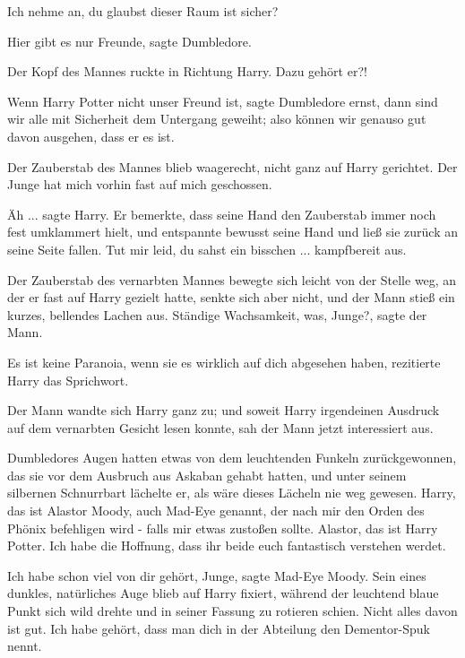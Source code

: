 \glqq{}Ich nehme an, du glaubst dieser Raum ist sicher?\grqq{}

\glqq{}Hier gibt es nur Freunde\grqq{}, sagte Dumbledore.

Der Kopf des Mannes ruckte in Richtung Harry. \glqq{}Dazu gehört er?!\grqq{}

\glqq{}Wenn Harry Potter nicht unser Freund ist\grqq{}, sagte Dumbledore ernst,
\glqq{}dann sind wir alle mit Sicherheit dem Untergang geweiht; also können wir
genauso gut davon ausgehen, dass er es ist.\grqq{}

Der Zauberstab des Mannes blieb waagerecht, nicht ganz auf Harry gerichtet.
\glqq{}Der Junge hat mich vorhin fast auf mich geschossen.\grqq{}

\glqq{}Äh ...\grqq{} sagte Harry. Er bemerkte, dass seine Hand den Zauberstab
immer noch fest umklammert hielt, und entspannte bewusst seine Hand und ließ sie
zurück an seine Seite fallen. \glqq{}Tut mir leid, du sahst ein bisschen ...
kampfbereit aus.\grqq{}

Der Zauberstab des vernarbten Mannes bewegte sich leicht von der Stelle weg, an
der er fast auf Harry gezielt hatte, senkte sich aber nicht, und der Mann stieß
ein kurzes, bellendes Lachen aus. \glqq{}Ständige Wachsamkeit, was,
Junge?\grqq{}, sagte der Mann.

\glqq{}Es ist keine Paranoia, wenn sie es wirklich auf dich abgesehen
haben\grqq{}, rezitierte Harry das Sprichwort.

Der Mann wandte sich Harry ganz zu; und soweit Harry irgendeinen Ausdruck auf
dem vernarbten Gesicht lesen konnte, sah der Mann jetzt interessiert aus.

Dumbledores Augen hatten etwas von dem leuchtenden Funkeln zurückgewonnen, das
sie vor dem Ausbruch aus Askaban gehabt hatten, und unter seinem silbernen
Schnurrbart lächelte er, als wäre dieses Lächeln nie weg gewesen. \glqq{}Harry,
das ist Alastor Moody, auch Mad-Eye genannt, der nach mir den Orden des Phönix
befehligen wird - falls mir etwas zustoßen sollte. Alastor, das ist Harry
Potter. Ich habe die Hoffnung, dass ihr beide euch fantastisch verstehen
werdet.\grqq{}

\glqq{}Ich habe schon viel von dir gehört, Junge\grqq{}, sagte Mad-Eye Moody.
Sein eines dunkles, natürliches Auge blieb auf Harry fixiert, während der
leuchtend blaue Punkt sich wild drehte und in seiner Fassung zu rotieren schien.
\glqq{}Nicht alles davon ist gut. Ich habe gehört, dass man dich in der Abteilung
den Dementor-Spuk nennt.\grqq{}

